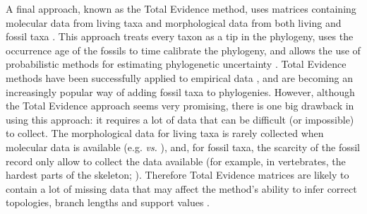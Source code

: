 \documentclass[12pt,letterpaper]{article}
\begin{document}
A final approach, known as the Total Evidence method, uses matrices containing molecular data from living taxa and morphological data from both living and fossil taxa \citep{eernissetaxonomic1993}. This approach treats every taxon as a tip in the phylogeny, uses the occurrence age of the fossils to time calibrate the phylogeny, and allows the use of probabilistic methods for estimating phylogenetic uncertainty \citep{ronquista2012}. Total Evidence methods have been successfully applied to empirical data \citep[e.g.][]{pyrondivergence2011,ronquista2012,schragocombining2013,slaterphylogenetic2013,beckancient2014}, and are becoming an increasingly popular way of adding fossil taxa to phylogenies. However, although the Total Evidence approach seems very promising, there is one big drawback in using this approach: it requires a lot of data that can be difficult (or impossible) to collect. The morphological data for living taxa is rarely collected when molecular data is available (e.g. \citealt{O'Leary08022013} \textit{vs.} \citealt{meredithimpacts2011}), and, for fossil taxa, the scarcity of the fossil record only allow to collect the data available (for example, in vertebrates, the hardest parts of the skeleton; \citealt{sansomfossilization2013}). Therefore Total Evidence matrices are likely to contain a lot of missing data that may affect the method's ability to infer correct topologies, branch lengths and support values \citep{salamin2003}. 
\end{document}
